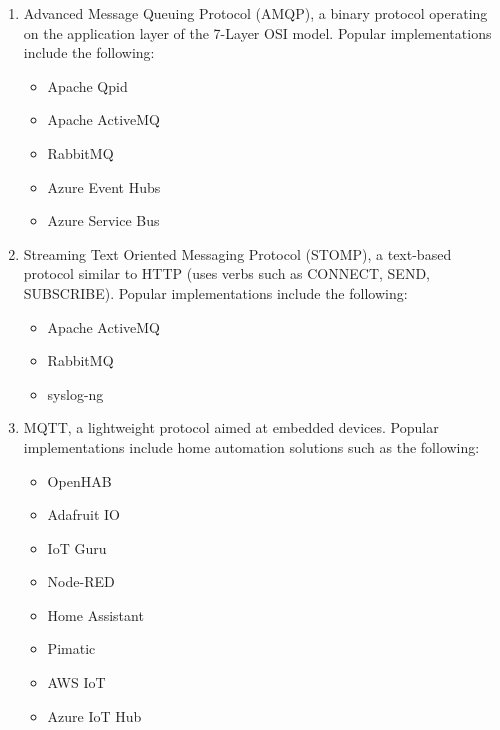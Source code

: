 \begin{enumerate}
\item 
Advanced Message Queuing Protocol (AMQP), a binary protocol operating on the application layer of the 7-Layer OSI model. Popular implementations include the following:

\begin{itemize}
\item 
Apache Qpid

\item 
Apache ActiveMQ

\item 
RabbitMQ

\item 
Azure Event Hubs

\item 
Azure Service Bus
\end{itemize}

\item 
Streaming Text Oriented Messaging Protocol (STOMP), a text-based protocol similar to HTTP (uses verbs such as CONNECT, SEND, SUBSCRIBE). Popular implementations include the following:

\begin{itemize}
\item 
Apache ActiveMQ

\item 
RabbitMQ

\item 
syslog-ng
\end{itemize}

\item 
MQTT, a lightweight protocol aimed at embedded devices. Popular implementations include home automation solutions such as the following:

\begin{itemize}
\item 
OpenHAB

\item 
Adafruit IO

\item 
IoT Guru

\item 
Node-RED

\item 
Home Assistant

\item 
Pimatic

\item 
AWS IoT

\item 
Azure IoT Hub
\end{itemize}

\end{enumerate}

